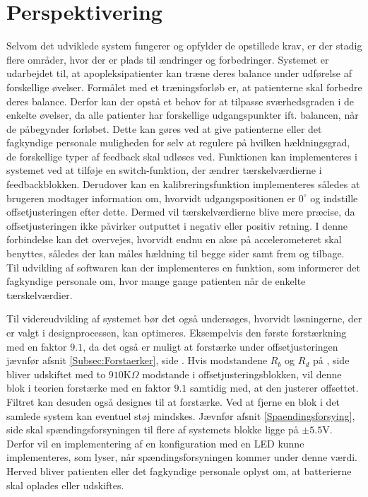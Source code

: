 \section{Perspektivering}
Selvom det udviklede system fungerer og opfylder de opstillede krav, er der stadig flere områder, hvor der er plads til ændringer og forbedringer. 
Systemet er udarbejdet til, at apopleksipatienter kan træne deres balance under udførelse af forskellige øvelser. Formålet med et træningsforløb er, at patienterne skal forbedre deres balance. Derfor kan der opstå et behov for at tilpasse sværhedsgraden i de enkelte øvelser, da alle patienter har forskellige udgangspunkter ift. balancen, når de påbegynder forløbet. Dette kan gøres ved at give patienterne eller det fagkyndige personale muligheden for selv at regulere på hvilken hældningsgrad, de forskellige typer af feedback skal udløses ved. Funktionen kan implementeres i systemet ved at tilføje en switch-funktion, der ændrer tærskelværdierne i feedbackblokken. Derudover kan en kalibreringsfunktion implementeres således at brugeren modtager information om, hvorvidt udgangspositionen er $0^{\circ}$ og indstille offsetjusteringen efter dette. Dermed vil tærskelværdierne blive mere præcise, da offsetjusteringen ikke påvirker outputtet i negativ eller positiv retning. %
I denne forbindelse kan det overvejes, hvorvidt endnu en akse på accelerometeret skal benyttes, således der kan måles hældning til begge sider samt frem og tilbage. \\
Til udvikling af softwaren kan der implementeres en funktion, som informerer det fagkyndige personale om, hvor mange gange patienten når de enkelte tærskelværdier.   

Til videreudvikling af systemet bør det også undersøges, hvorvidt løsningerne, der er valgt i designprocessen, kan optimeres. Eksempelvis den første forstærkning med en faktor $9.1$, da det også er muligt at forstærke under offsetjusteringen jævnfør afsnit \ref{Subsec:Forstaerker}, side \pageref{Subsec:Forstaerker}. Hvis modstandene $R_{b}$ og $R_{d}$ på , side \pageref{fig:Forstaerker_faktor18} bliver udskiftet med to $910$K$\Omega$ modstande i offsetjusteringsblokken, vil denne blok i teorien forstærke med en faktor $9.1$ samtidig med, at den justerer offsettet. Filtret kan desuden også designes til at forstærke. Ved at fjerne en blok i det samlede system kan eventuel støj mindskes. Jævnfør afsnit \ref{Spaendingsforsying}, side \pageref{Spaendingsforsying} skal spændingsforsyningen til flere af systemets blokke ligge på $\pm5.5$V. Derfor vil en implementering af en konfiguration med en LED kunne implementeres, som lyser, når spændingsforsyningen kommer under denne værdi. Herved bliver patienten eller det fagkyndige personale oplyst om, at batterierne skal oplades eller udskiftes.

